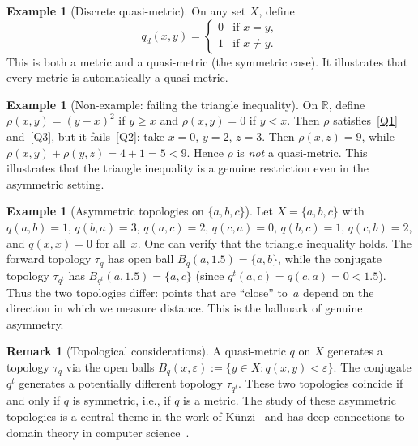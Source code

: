 \documentclass[11pt,a4paper]{article}
\theoremstyle{plain}
\theoremstyle{definition}
\newtheorem{exampleinner}[theoreminner]{Example}
\newtheorem{remarkinner}[theoreminner]{Remark}
\newenvironment{example}[1][]{\begin{exampleinner}[#1]}{\end{exampleinner}}
\newenvironment{remark}[1][]{\begin{remarkinner}[#1]}{\end{remarkinner}}
\newcommand{\R}{\mathbb{R}}
\newcommand{\eps}{\varepsilon}
\begin{document}
\begin{example}[Discrete quasi-metric]\label{ex:discrete-qm}
On any set $X$, define
\[
  q_d(x,y)=\begin{cases} 0 & \text{if } x=y,\\ 1 & \text{if } x\neq y.\end{cases}
\]
This is both a metric and a quasi-metric (the symmetric case).  It
illustrates that every metric is automatically a quasi-metric.
\end{example}

\begin{example}[Non-example: failing the triangle inequality]\label{ex:non-qm}
On $\R$, define $\rho(x,y)=(y-x)^2$ if $y\ge x$ and $\rho(x,y)=0$
if $y<x$.  Then $\rho$ satisfies~\ref{Q1} and~\ref{Q3}, but it
fails~\ref{Q2}: take $x=0$, $y=2$, $z=3$.  Then $\rho(x,z)=9$,
while $\rho(x,y)+\rho(y,z)=4+1=5<9$.  Hence $\rho$ is \emph{not}
a quasi-metric.  This illustrates that the triangle inequality is a
genuine restriction even in the asymmetric setting.
\end{example}

\begin{example}[Asymmetric topologies on $\{a,b,c\}$]\label{ex:asym-topologies}
Let $X=\{a,b,c\}$ with $q(a,b)=1$, $q(b,a)=3$, $q(a,c)=2$,
$q(c,a)=0$, $q(b,c)=1$, $q(c,b)=2$, and $q(x,x)=0$ for all~$x$.
One can verify that the triangle inequality holds.  The forward
topology $\tau_q$ has open ball $B_q(a,1.5)=\{a,b\}$, while the
conjugate topology $\tau_{q^t}$ has $B_{q^t}(a,1.5)=\{a,c\}$
(since $q^t(a,c)=q(c,a)=0<1.5$).  Thus the two topologies differ:
points that are ``close'' to~$a$ depend on the direction in which we
measure distance.  This is the hallmark of genuine asymmetry.
\end{example}

\begin{remark}[Topological considerations]\label{rem:topology}
A quasi-metric $q$ on $X$ generates a topology $\tau_q$ via the
open balls $B_q(x,\eps):=\{y\in X:q(x,y)<\eps\}$.  The conjugate
$q^t$ generates a potentially different topology $\tau_{q^t}$.
These two topologies coincide if and only if $q$ is symmetric, i.e.,
if $q$ is a metric.  The study of these asymmetric topologies is a
central theme in the work of K\"unzi~\cite{kunzi1995,kunzi2001} and
has deep connections to domain theory in computer
science~\cite{abramsky1994,scott1982}.
\end{remark}


\end{document}

